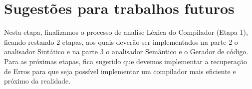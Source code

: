 \chapter{Sugestões para trabalhos futuros}

Nesta etapa, finalizamos o processo de analise Léxica do Compilador (Etapa 1), ficando restando 2 etapas, aos quais deverão ser implementados na parte 2 o analisador Sintático e na parte 3 o analisador Semântico e o Gerador de código.
Para as próximas etapas, fica sugerido que devemos implementar a recuperação de Erros para que seja possível implementar um compilador mais eficiente e próximo da realidade.